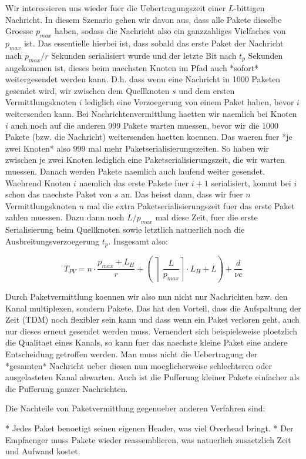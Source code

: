 Wir interessieren uns wieder fuer die Uebertragungszeit einer $L$-bittigen
Nachricht. In diesem Szenario gehen wir davon aus, dass alle Pakete dieselbe
Groesse $p_{max}$ haben, sodass die Nachricht also ein ganzzahliges Vielfaches
von $p_{max}$ ist. Das essentielle hierbei ist, dass sobald das erste Paket der
Nachricht nach $p_{max}/r$ Sekunden serialisiert wurde und der letzte Bit nach
$t_p$ Sekunden angekommen ist, dieses beim naechsten Knoten im Pfad auch
*sofort* weitergesendet werden kann. D.h. dass wenn eine Nachricht in 1000
Paketen gesendet wird, wir zwischen dem Quellknoten $s$ und dem ersten
Vermittlungsknoten $i$ lediglich eine Verzoegerung von einem Paket haben, bevor
$i$ weitersenden kann. Bei Nachrichtenvermittlung haetten wir naemlich bei
Knoten $i$ auch noch auf die anderen 999 Pakete warten muessen, bevor wir die
1000 Pakete (bzw. die Nachricht) weitersenden haetten koennen. Das waeren fuer
*je zwei Knoten* also 999 mal mehr Paketserialisierungszeiten. So haben wir
zwischen je zwei Knoten lediglich eine Paketserialisierungszeit, die wir warten
muessen. Danach werden Pakete naemlich auch laufend weiter gesendet. Waehrend
Knoten $i$ naemlich das erste Pakete fuer $i + 1$ serialisiert, kommt bei $i$
schon das naechste Paket von $s$ an. Das heisst dann, dass wir fuer $n$
Vermittlungsknoten $n$ mal die extra Paketserialisierungszeit fuer das erste
Paket zahlen muessen. Dazu dann noch $L/p_{max}$ mal diese Zeit, fuer die erste
Serialisierung beim Quellknoten sowie letztlich natuerlich noch die
Ausbreitungsverzoegerung $t_p$. Insgesamt also:

$$T_{PV} = n \cdot \frac{p_{max} + L_H}{r} +
(\left\rceil\frac{L}{p_{max}}\right\rceil \cdot L_H + L) + \frac{d}{\nu c}$$

Durch Paketvermittlung koennen wir also nun nicht nur Nachrichten bzw. den Kanal
multiplexen, sondern Pakete. Das hat den Vorteil, dass die Aufspaltung der Zeit
(TDM) noch flexibler sein kann und dass wenn ein Paket verloren geht, auch nur
dieses erneut gesendet werden muss. Veraendert sich beispielsweise ploetzlich
die Qualitaet eines Kanals, so kann fuer das naechste kleine Paket eine andere
Entscheidung getroffen werden. Man muss nicht die Uebertragung der *gesamten*
Nachricht ueber diesen nun moeglicherweise schlechteren oder ausgelasteten Kanal
abwarten. Auch ist die Pufferung kleiner Pakete einfacher als die Pufferung
ganzer Nachrichten.

Die Nachteile von Paketvermittlung gegenueber anderen Verfahren sind:

* Jedes Paket benoetigt seinen eigenen Header, was viel Overhead bringt.
* Der Empfaenger muss Pakete wieder reassemblieren, was natuerlich zusaetzlich
  Zeit und Aufwand kostet.

